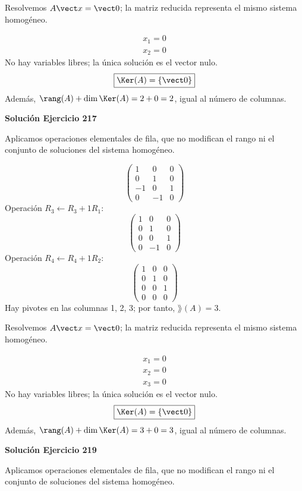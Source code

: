 Resolvemos $A\vect x=\vect0$; la matriz reducida representa el mismo sistema homogéneo.

\[
\begin{aligned}x_{1}=0\\x_{2}=0\end{aligned}
\]
No hay variables libres; la única solución es el vector nulo.
\[
\boxed{\Ker(A)=\{\vect0\}}
\]
Además, $\rang(A)+\dim\Ker(A)=2+0=2$, igual al número de columnas.


\par\bigskip\noindent\textbf{Solución Ejercicio 217}\par\nobreak
Aplicamos operaciones elementales de fila, que no modifican el rango ni el conjunto de soluciones del sistema homogéneo.

\[
\begin{pmatrix}1&0&0\\0&1&0\\-1&0&1\\0&-1&0\end{pmatrix}
\]
Operación $R_{3}\leftarrow R_{3}+1R_{1}$:
\[
\begin{pmatrix}1&0&0\\0&1&0\\0&0&1\\0&-1&0\end{pmatrix}
\]
Operación $R_{4}\leftarrow R_{4}+1R_{2}$:
\[
\begin{pmatrix}1&0&0\\0&1&0\\0&0&1\\0&0&0\end{pmatrix}
\]
Hay pivotes en las columnas 1, 2, 3; por tanto, $\boxed{\rang(A)=3}$.

Resolvemos $A\vect x=\vect0$; la matriz reducida representa el mismo sistema homogéneo.

\[
\begin{aligned}x_{1}=0\\x_{2}=0\\x_{3}=0\end{aligned}
\]
No hay variables libres; la única solución es el vector nulo.
\[
\boxed{\Ker(A)=\{\vect0\}}
\]
Además, $\rang(A)+\dim\Ker(A)=3+0=3$, igual al número de columnas.


\par\bigskip\noindent\textbf{Solución Ejercicio 219}\par\nobreak
Aplicamos operaciones elementales de fila, que no modifican el rango ni el conjunto de soluciones del sistema homogéneo.

